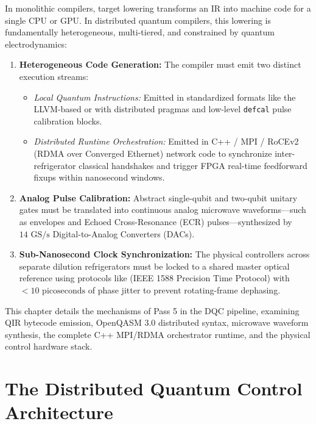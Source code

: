 In monolithic compilers, target lowering transforms an IR into machine code for a single CPU or GPU. In distributed quantum compilers, this lowering is fundamentally heterogeneous, multi-tiered, and constrained by quantum electrodynamics:
\begin{enumerate}
    \item \textbf{Heterogeneous Code Generation:} The compiler must emit two distinct execution streams:
    \begin{itemize}
        \item \textit{Local Quantum Instructions:} Emitted in standardized formats like the LLVM-based  or  with distributed pragmas and low-level \texttt{defcal} pulse calibration blocks.
        \item \textit{Distributed Runtime Orchestration:} Emitted in C++ / MPI / RoCEv2 (RDMA over Converged Ethernet) network code to synchronize inter-refrigerator classical handshakes and trigger FPGA real-time feedforward fixups within nanosecond windows.
    \end{itemize}
    \item \textbf{Analog Pulse Calibration:} Abstract single-qubit and two-qubit unitary gates must be translated into continuous analog microwave waveforms---such as  envelopes and Echoed Cross-Resonance (ECR) pulses---synthesized by $14\text{ GS/s}$ Digital-to-Analog Converters (DACs).
    \item \textbf{Sub-Nanosecond Clock Synchronization:} The physical controllers across separate dilution refrigerators must be locked to a shared master optical reference using protocols like  (IEEE 1588 Precision Time Protocol) with $<10\text{ picoseconds}$ of phase jitter to prevent rotating-frame dephasing.
\end{enumerate}

This chapter details the mechanisms of Pass 5 in the DQC pipeline, examining QIR bytecode emission, OpenQASM 3.0 distributed syntax, microwave waveform synthesis, the complete C++ MPI/RDMA orchestrator runtime, and the physical control hardware stack.

\section{The Distributed Quantum Control Architecture}
\label{sec:hardware_control_stack}

